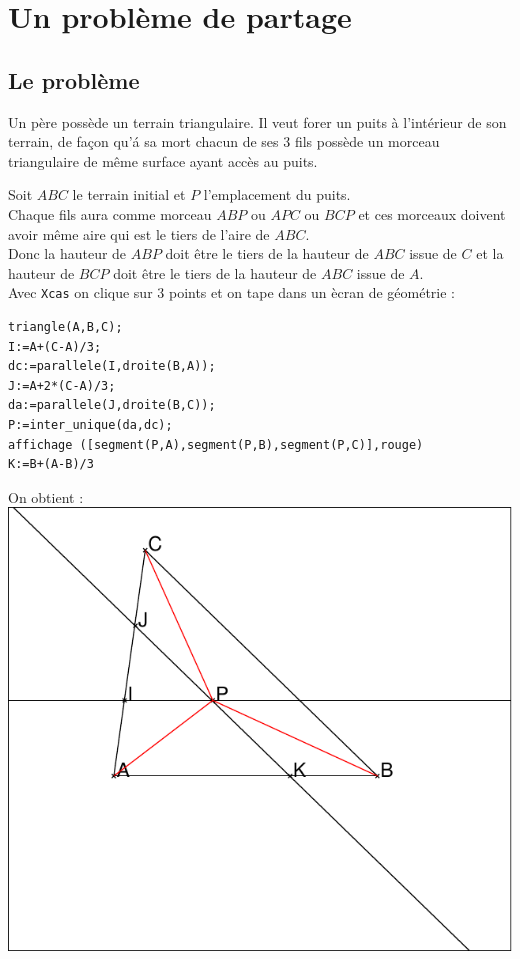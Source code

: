 \documentclass[a4paper,11pt]{book}
\begin{document}
\section{Un probl\`eme de partage}
\subsection{Le probl\`eme}
Un p\`ere poss\`ede un terrain triangulaire. Il veut forer un puits \`a 
l'int\'erieur de son terrain, de fa\c{c}on qu'\'a sa mort chacun de ses 3 fils 
poss\`ede un morceau triangulaire de m\^eme surface ayant acc\`es au puits.

Soit $ABC$ le terrain initial et $P$ l'emplacement du puits.\\
Chaque fils aura comme morceau $ABP$ ou $APC$ ou $BCP$ et ces morceaux 
doivent avoir m\^eme aire qui est le tiers de l'aire de  $ABC$.\\
Donc la hauteur de $ABP$ doit \^etre le tiers de la hauteur de $ABC$ issue de 
$C$ et la hauteur de $BCP$ doit \^etre le tiers de la hauteur de $ABC$ issue de
$A$.\\
Avec {\tt Xcas} on clique sur 3 points et on 
tape dans un \`ecran de g\'eom\'etrie :\\
\begin{verbatim}
triangle(A,B,C);
I:=A+(C-A)/3;
dc:=parallele(I,droite(B,A));
J:=A+2*(C-A)/3;
da:=parallele(J,droite(B,C));
P:=inter_unique(da,dc);
affichage ([segment(P,A),segment(P,B),segment(P,C)],rouge)
K:=B+(A-B)/3
\end{verbatim}
On obtient :\\

\includegraphics[width=\textwidth]{triangle}
\end{document}
